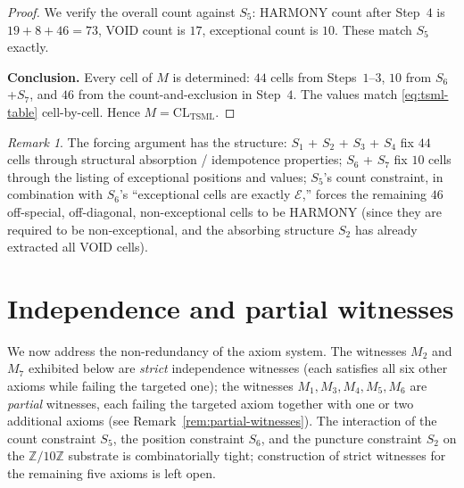 \documentclass[11pt,reqno]{amsart}
\theoremstyle{plain}
\theoremstyle{definition}
\theoremstyle{remark}
\newtheorem*{remark}{Remark}
\newcommand{\Z}{\mathbb{Z}}
\newcommand{\TSML}{\mathrm{TSML}}
\newcommand{\CL}{\mathrm{CL}}
\begin{document}
\begin{proof}
We verify the overall count against $S_{5}$: HARMONY count after
Step~$4$ is $19 + 8 + 46 = 73$, VOID count is $17$, exceptional
count is $10$. These match $S_{5}$ exactly.

\smallskip
\noindent\textbf{Conclusion.}
Every cell of $M$ is determined: $44$ cells from Steps~$1$--$3$,
$10$ from $S_{6}$+$S_{7}$, and $46$ from the count-and-exclusion in
Step~$4$. The values match \eqref{eq:tsml-table} cell-by-cell.
Hence $M = \CL_{\TSML}$.
\end{proof}

\begin{remark}
The forcing argument has the structure: $S_{1}$ + $S_{2}$ + $S_{3}$ +
$S_{4}$ fix $44$ cells through structural absorption / idempotence
properties; $S_{6}$ + $S_{7}$ fix $10$ cells through the listing of
exceptional positions and values; $S_{5}$'s count constraint, in
combination with $S_{6}$'s ``exceptional cells are exactly
$\mathcal{E}$,'' forces the remaining $46$ off-special, off-diagonal,
non-exceptional cells to be HARMONY (since they are required to be
non-exceptional, and the absorbing structure $S_{2}$ has already
extracted all VOID cells).
\end{remark}

\section{Independence and partial witnesses}
\label{sec:independence}

We now address the non-redundancy of the axiom system. The
witnesses $M_{2}$ and $M_{7}$ exhibited below are \emph{strict}
independence witnesses (each satisfies all six other axioms while
failing the targeted one); the witnesses $M_{1}, M_{3}, M_{4},
M_{5}, M_{6}$ are \emph{partial} witnesses, each failing the
targeted axiom together with one or two additional axioms
(see Remark~\ref{rem:partial-witnesses}). The interaction of the
count constraint $S_{5}$, the position constraint $S_{6}$, and the
puncture constraint $S_{2}$ on the $\Z/10\Z$ substrate is
combinatorially tight; construction of strict witnesses for the
remaining five axioms is left open.
\end{document}
